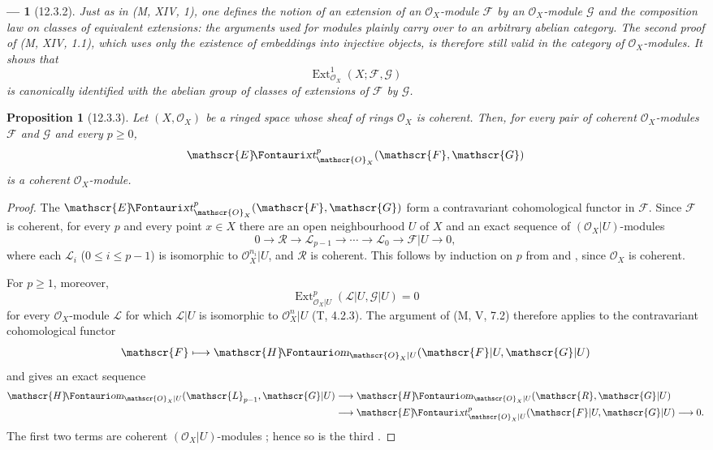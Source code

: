 \documentclass[oneside]{amsart}
\theoremstyle{ega-env-style}
\newtheorem*{env}{---}
\theoremstyle{ega-thm-env-style}
\newtheorem*{proposition}{Proposition}
\theoremstyle{ega-defn-env-style}
\def\mathcal{\mathscr}
\def\sh{\mathcal}                   %
\def\leq{\leqslant}                 %
\def\geq{\geqslant}                 %
\def\Ext{\operatorname{Ext}}
\def\shHom{\sh{H}\textup{\kern-2.2pt{\Fontauri\slshape om}}}   %
\def\shExt{\sh{E}\textup{\kern-2.2pt{\Fontauri\slshape xt}}}   %
\let\EGAOriginalLabel\label
\renewcommand{\label}[1]{\phantomsection\EGAOriginalLabel{#1}}
\begin{document}
\begin{env}[12.3.2]
\label{0.12.3.2}
Just as in (M, XIV, 1), one defines the notion of an
\emph{extension} of an $\sh{O}_X$-module $\sh{F}$ by an
$\sh{O}_X$-module $\sh{G}$ and the composition law on classes of
equivalent extensions: the arguments used for modules plainly carry
over to an arbitrary abelian category.
The second proof of (M, XIV, 1.1), which uses only the existence of
embeddings into injective objects, is therefore still valid in the
category of $\sh{O}_X$-modules.  It shows that
\[
  \Ext^1_{\sh{O}_X}(X;\sh{F},\sh{G})
\]
is canonically identified with the abelian group of classes of
extensions of $\sh{F}$ by $\sh{G}$.
\end{env}

\begin{proposition}[12.3.3]
\label{0.12.3.3}
Let $(X,\sh{O}_X)$ be a ringed space whose sheaf of rings
$\sh{O}_X$ is coherent.
Then, for every pair of coherent $\sh{O}_X$-modules $\sh{F}$ and
$\sh{G}$ and every $p\geq0$,
\[
  \shExt^p_{\sh{O}_X}(\sh{F},\sh{G})
\]
is a coherent $\sh{O}_X$-module.
\end{proposition}

\begin{proof}
The $\shExt^p_{\sh{O}_X}(\sh{F},\sh{G})$ form a contravariant
cohomological functor in $\sh{F}$.
Since $\sh{F}$ is coherent, for every $p$ and every point $x\in X$
there are an open neighbourhood $U$ of $X$ and an exact
sequence of $(\sh{O}_X|U)$-modules
\[
  0\longrightarrow\sh{R}\longrightarrow\sh{L}_{p-1}
  \longrightarrow\cdots\longrightarrow\sh{L}_0
  \longrightarrow\sh{F}|U\longrightarrow0,
\]
where each $\sh{L}_i$ ($0\leq i\leq p-1$) is isomorphic to
$\sh{O}_X^{n_i}|U$, and $\sh{R}$ is coherent.
This follows by induction on $p$ from
 and
, since $\sh{O}_X$ is coherent.

For $p\geq1$, moreover,
\[
  \Ext^p_{\sh{O}_X|U}(\sh{L}|U,\sh{G}|U)=0
\]
for every $\sh{O}_X$-module $\sh{L}$ for which $\sh{L}|U$ is
isomorphic to $\sh{O}_X^n|U$ (T, 4.2.3).
The argument of (M, V, 7.2) therefore applies to the contravariant
cohomological functor
\[
  \sh{F}\longmapsto
  \shHom_{\sh{O}_X|U}(\sh{F}|U,\sh{G}|U)
\]
and gives an exact sequence
\[
  \begin{aligned}
  \shHom_{\sh{O}_X|U}(\sh{L}_{p-1},\sh{G}|U)
  &\longrightarrow
  \shHom_{\sh{O}_X|U}(\sh{R},\sh{G}|U)\\
  &\longrightarrow
  \shExt^p_{\sh{O}_X|U}(\sh{F}|U,\sh{G}|U)
  \longrightarrow0.
  \end{aligned}
\]
The first two terms are coherent $(\sh{O}_X|U)$-modules
; hence so is the third
.
\end{proof}
\end{document}
